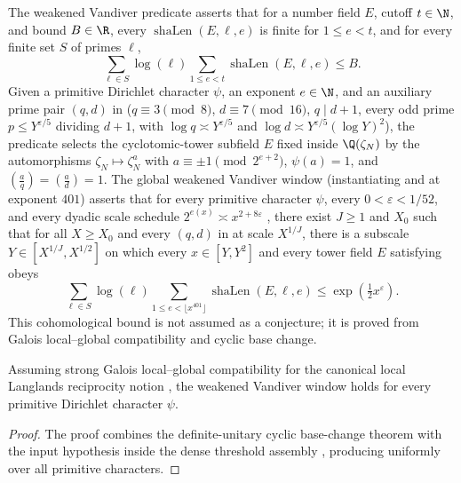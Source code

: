 The weakened Vandiver predicate  asserts that
for a number field $E$, cutoff $t \in \N$, and bound $B \in \R$, every
$\operatorname{shaLen}(E, \ell, e)$ is finite for $1 \le e < t$, and for every
finite set $S$ of primes $\ell$,
\[
  \sum_{\ell \in S} \log(\ell) \sum_{1 \le e < t}
    \operatorname{shaLen}(E, \ell, e) \le B.
\]
Given a primitive Dirichlet character $\psi$, an exponent $e \in \N$, and an
auxiliary prime pair $(q, d)$ in 
($q \equiv 3 \pmod 8$, $d \equiv 7 \pmod{16}$, $q \mid d + 1$, every odd prime
$p \le Y^{\varepsilon/5}$ dividing $d + 1$, with
$\log q \asymp Y^{\varepsilon/5}$ and
$\log d \asymp Y^{\varepsilon/5}(\log Y)^2$), the predicate
 selects the cyclotomic-tower subfield $E$
fixed inside $\Q(\zeta_N)$ by the automorphisms $\zeta_N \mapsto \zeta_N^a$
with $a \equiv \pm 1 \pmod{2^{e+2}}$, $\psi(a) = 1$, and
$(\frac{a}{q}) = (\frac{a}{d}) = 1$. The global weakened Vandiver window
 (instantiating 
and  at exponent $401$) asserts that for every
primitive character $\psi$, every $0 < \varepsilon < 1/52$, and every dyadic
scale schedule $2^{e(x)} \asymp x^{2 + 8\varepsilon}$
, there exist $J \ge 1$ and $X_0$ such that
for all $X \ge X_0$ and every $(q, d)$ in 
at scale $X^{1/J}$, there is a subscale $Y \in [X^{1/J}, X^{1/2}]$ on which
every $x \in [Y, Y^2]$ and every tower field $E$ satisfying
 obeys
\[
  \sum_{\ell \in S} \log(\ell) \sum_{1 \le e < \lfloor x^{401} \rfloor}
    \operatorname{shaLen}(E, \ell, e)
  \le \exp\!\left(\tfrac{1}{2} x^\varepsilon\right).
\]
This cohomological bound is not assumed as a conjecture; it is proved from
Galois local--global compatibility and cyclic base change.

\begin{theorem}
\label{thm:vwin-of-row}
Assuming strong Galois local--global compatibility
 for the canonical local Langlands
reciprocity notion , the weakened
Vandiver window  holds for every primitive
Dirichlet character $\psi$.
\end{theorem}

\begin{proof}
The proof combines the definite-unitary cyclic base-change theorem
 with the input
hypothesis  inside the dense threshold
assembly ,
producing  uniformly over all primitive
characters.
\end{proof}

